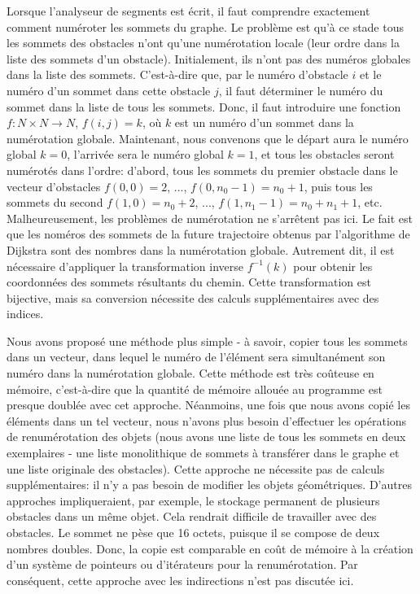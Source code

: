 \documentclass[12pt]{article}
\begin{document}
	Lorsque l'analyseur de segments est écrit, il faut comprendre exactement comment numéroter les sommets du graphe. Le problème est qu'à ce stade tous les sommets des obstacles n'ont qu'une numérotation locale (leur ordre dans la liste des sommets d'un obstacle). Initialement, ils n'ont pas des numéros globales dans la liste des sommets. C'est-à-dire que, par le numéro d'obstacle $i$ et le numéro d'un sommet dans cette obstacle $j$, il faut déterminer le numéro du sommet dans la liste de tous les sommets. Donc, il faut introduire une fonction $f: N \times N \rightarrow N$, $f(i, j) = k$, où $k$ est un numéro d'un sommet dans la numérotation globale. Maintenant, nous convenons que le départ aura le numéro global $k = 0$, l'arrivée sera le numéro global $k = 1$, et tous les obstacles seront numérotés dans l'ordre: d'abord, tous les sommets du premier obstacle dans le vecteur d'obstacles $f(0,0) = 2$, ..., $f(0, n_0-1) = n_0 + 1$, puis tous les sommets du second $f(1,0) = n_0 + 2$, ..., $f(1, n_1-1) = n_0 + n_1 + 1$, etc.
	Malheureusement, les problèmes de numérotation ne s'arrêtent pas ici. Le fait est que les noméros des sommets de la future trajectoire obtenus par l'algorithme de Dijkstra sont des nombres dans la numérotation globale. Autrement dit, il est nécessaire d'appliquer la transformation inverse $f^{- 1}(k)$ pour obtenir les coordonnées des sommets résultants du chemin. Cette transformation est bijective, mais sa conversion nécessite des calculs supplémentaires avec des indices.
	
	Nous avons proposé une méthode plus simple - à savoir, copier tous les sommets dans un vecteur, dans lequel le numéro de l'élément sera simultanément son numéro dans la numérotation globale. Cette méthode est très coûteuse en mémoire, c'est-à-dire que la quantité de mémoire allouée au programme est presque doublée avec cet approche. Néanmoins, une fois que nous avons copié les éléments dans un tel vecteur, nous n'avons plus besoin d'effectuer les opérations de renumérotation des objets (nous avons une liste de tous les sommets en deux exemplaires - une liste monolithique de sommets à transférer dans le graphe et une liste originale des obstacles). Cette approche ne nécessite pas de calculs supplémentaires: il n'y a pas besoin de modifier les objets géométriques. D'autres approches impliqueraient, par exemple, le stockage permanent de plusieurs obstacles dans un même objet. Cela rendrait difficile de travailler avec des obstacles. Le sommet ne pèse que 16 octets, puisque il se compose de deux nombres doubles. Donc, la copie est comparable en coût de mémoire à la création d'un système de pointeurs ou d'itérateurs pour la renumérotation. Par conséquent, cette approche avec les indirections n'est pas discutée ici.
	
\end{document}
